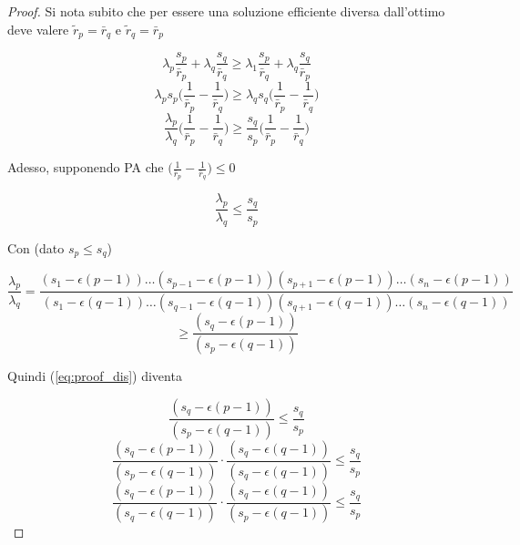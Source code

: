 \begin{proof}
    Si nota subito che per essere una soluzione efficiente diversa dall'ottimo deve valere 
    $\tilde{r}_p = \bar{r}_q$ e $\tilde{r}_q = \bar{r}_p$  
    
    \begin{equation*}
        \lambda_p \frac{s_p}{\bar{r}_p} + \lambda_{q} \frac{s_{q}}{\bar{r}_{q}} \geq
        \lambda_1 \frac{s_p}{\bar{r}_q} + \lambda_{q} \frac{s_{q}}{\bar{r}_{p}}
        \label{eq:}
    \end{equation*}
    \begin{equation*}
        \lambda_p s_p \bigg( \frac{1}{\bar{r}_p} - \frac{1}{\bar{r}_q}\bigg) \geq 
        \lambda_q s_q \bigg( \frac{1}{\bar{r}_p} - \frac{1}{\bar{r}_q} \bigg)
        \label{eq:proof}
    \end{equation*}
    \begin{equation*}
        \frac{\lambda_p}{\lambda_q}  \bigg( \frac{1}{\bar{r}_p} - \frac{1}{\bar{r}_q}\bigg) \geq 
        \frac{s_q}{s_p} \bigg( \frac{1}{\bar{r}_p} - \frac{1}{\bar{r}_q} \bigg)
        \label{eq:proof}
    \end{equation*}
    
    Adesso, supponendo PA che $\bigg( \frac{1}{\bar{r}_p} - \frac{1}{\bar{r}_q} \bigg) \leq 0$
    
    \begin{equation}
        \frac{\lambda_p}{\lambda_q} \leq 
        \frac{s_q}{s_p}
        \label{eq:proof_dis}
    \end{equation}
    
    Con (dato $s_p \leq s_q$) 
    
    \begin{equation*}
        \frac{\lambda_p}{\lambda_q} = \frac{(s_1 - \epsilon(p-1))\dots(s_{p-1} - \epsilon(p-1))(s_{p+1} - \epsilon(p-1))
        \dots(s_n - \epsilon(p-1))}
        {(s_1 - \epsilon(q-1))\dots(s_{q-1} - \epsilon(q-1))(s_{q+1} - \epsilon(q-1))\dots(s_n - \epsilon(q-1))}
        \label{eq:}
    \end{equation*}
    \begin{equation*}
        \geq \frac{(s_q - \epsilon(p-1))}
        {(s_p - \epsilon(q-1))}
        \label{eq:}
    \end{equation*}
    
    Quindi (\ref{eq:proof_dis}) diventa
    
    \begin{equation*}
        \frac{(s_q - \epsilon(p-1))}
        {(s_p - \epsilon(q-1))} \leq 
        \frac{s_q}{s_p}
        \label{eq:proof}
    \end{equation*}
    \begin{equation*}
        \frac{(s_q - \epsilon(p-1))}
        {(s_p - \epsilon(q-1))}
        \cdot
        \frac{(s_q - \epsilon(q-1))}
        {(s_q - \epsilon(q-1))} \leq 
        \frac{s_q}{s_p}
        \label{eq:proof}
    \end{equation*}
    \begin{equation*}
        \frac{(s_q - \epsilon(p-1))}
        {(s_q - \epsilon(q-1))}
        \cdot
        \frac{(s_q - \epsilon(q-1))}
        {(s_p - \epsilon(q-1))} \leq 
        \frac{s_q}{s_p}
        \label{eq:proof}
    \end{equation*}
    

\end{proof}
